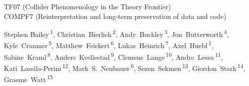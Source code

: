 \documentclass[11pt]{article}
\begin{document}
\pubblock

\snowmass{}


\begin{center}{\large
TF07 (Collider Phenomenology in the Theory Frontier)\\
COMPF7 (Reinterpretation and long-term preservation of data and code)}
\end{center}




\begin{center}
Stephen Bailey\,\textsuperscript{1},   
Christian~Bierlich\,\textsuperscript{2},
Andy~Buckley\,\textsuperscript{3},
Jon~Butterworth\,\textsuperscript{4},
Kyle~Cranmer\,\textsuperscript{5},
Matthew~Feickert\,\textsuperscript{6},
Lukas~Heinrich\,\textsuperscript{7},
Axel~Huebl\,\textsuperscript{1},  
Sabine~Kraml\,\textsuperscript{8},
Anders~Kvellestad\,\textsuperscript{9},
Clemens~Lange\,\textsuperscript{10},
Andre~Lessa\,\textsuperscript{11},
Kati~Lassila-Perini\,\textsuperscript{12},
Mark~S.~Neubauer\,\textsuperscript{6},  
Sezen~Sekmen\,\textsuperscript{13},
Giordon~Stark\,\textsuperscript{14},
Graeme~Watt\,\textsuperscript{15}
\end{center}
\end{document}
